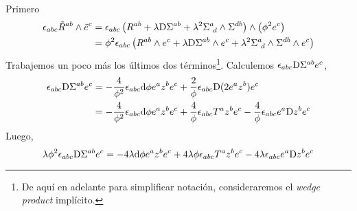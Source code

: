 Primero
\begin{align}
  \epsilon_{abc}\tilde{R}^{ab}\wedge \tilde{e}^c&=\epsilon_{abc}\left(R^{ab}+\lambda \mathrm{D} \Sigma^{ab}+\lambda^2 \Sigma^{a}_{~d}\wedge \Sigma^{db}\right)\wedge\left(\phi^2e^c\right)\\
  &=\phi^2\epsilon_{abc}\left(R^{ab}\wedge e^c+\lambda \mathrm{D} \Sigma^{ab}\wedge e^c+\lambda^2 \Sigma^{a}_{~d}\wedge \Sigma^{db}\wedge e^c\right)\label{inv}
\end{align}
Trabajemos un poco más los últimos dos términos\footnote{De aquí en adelante para simplificar notación, consideraremos el \textit{wedge product} implícito.}. Calculemos $\epsilon_{abc} \mathrm{D}\Sigma^{ab}e^c$,
\begin{align}
  \epsilon_{abc} \mathrm{D}\Sigma^{ab}e^c&=-\frac{4}{\phi^2}\epsilon_{abc}\dd\phi e^{a}z^be^c+\frac{2}{\phi}\epsilon_{abc} \mathrm{D}(2e^{a}z^b)e^c\\
  &=-\frac{4}{\phi^2}\epsilon_{abc}\dd\phi e^{a}z^be^c+\frac{4}{\phi}\epsilon_{abc} T^{a}z^be^c-\frac{4}{\phi}\epsilon_{abc} e^{a}\mathrm{D} z^be^c
\end{align}
Luego,
\begin{equation}\label{2do termino}
  \lambda\phi^2\epsilon_{abc}\mathrm{D} \Sigma^{ab}e^c=-4\lambda\dd\phi e^{a}z^be^c+4\lambda\phi\epsilon_{abc} T^{a}z^be^c-4\lambda\epsilon_{abc} e^{a}\mathrm{D} z^be^c
\end{equation}

